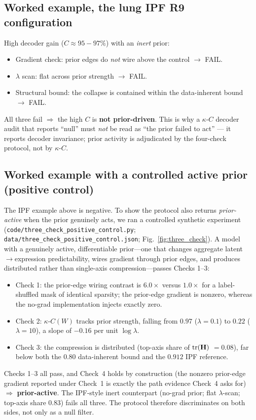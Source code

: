 \documentclass[11 pt,a4 paper]{article}
\newcommand{\Hmat}{\mathbf{H}}\newcommand{\Wmat}{\mathbf{W}}\newcommand{\Jmat}{\mathbf{J}}
\begin{document}
\subsection*{Worked example, the lung IPF R9 configuration}
High decoder gain ($C \approx 95\!-\!97\%$) with an \emph{inert} prior:
\begin{itemize}[leftmargin=1.2 em]
\item Gradient check: prior edges do \emph{not} wire above the control $\rightarrow$ FAIL.
\item $\lambda$ scan: flat across prior strength $\rightarrow$ FAIL.
\item Structural bound: the collapse is contained within the data-inherent bound $\rightarrow$ FAIL.
\end{itemize}
All three fail $\Rightarrow$ the high $C$ is \textbf{not prior-driven}. This is
why a $\kappa$-$C$ decoder audit that reports ``null'' must \emph{not} be read as
``the prior failed to act'' --- it reports decoder invariance; prior activity is
adjudicated by the four-check protocol, not by $\kappa$-$C$.

\subsection*{Worked example with a controlled active prior (positive control)}
The IPF example above is negative. To show the protocol also returns \emph{prior-active}
when the prior genuinely acts, we ran a controlled synthetic experiment
(\texttt{code/three\_check\_positive\_control.py};
\texttt{data/three\_check\_positive\_control.json}; Fig.~\ref{fig:three_check}).
A model with a genuinely active, differentiable prior---one that changes aggregate
latent$\to$expression predictability, wires gradient through prior edges, and produces
distributed rather than single-axis compression---passes Checks 1--3:
\begin{itemize}[leftmargin=1.2 em]
\item Check 1: the prior-edge wiring contrast is $6.0\times$ versus $1.0\times$ for a
 label-shuffled mask of identical sparsity; the prior-edge gradient is nonzero,
 whereas the no-grad implementation injects exactly zero.
\item Check 2: $\kappa$-$C(W)$ tracks prior strength, falling from $0.97$ ($\lambda=0.1$)
 to $0.22$ ($\lambda=10$), a slope of $-0.16$ per unit $\log\lambda$.
\item Check 3: the compression is distributed (top-axis share of $\trloss(\Hmat)$
 $=0.08$), far below both the $0.80$ data-inherent bound and the $0.912$ IPF
 reference.
\end{itemize}
Checks 1--3 all pass, and Check~4 holds by construction (the nonzero
prior-edge gradient reported under Check~1 is exactly the path evidence
Check~4 asks for) $\Rightarrow$ \textbf{prior-active}. The IPF-style inert counterpart
(no-grad prior; flat $\lambda$-scan; top-axis share $0.83$) fails all three. The
protocol therefore discriminates on both sides, not only as a null filter.
\end{document}
